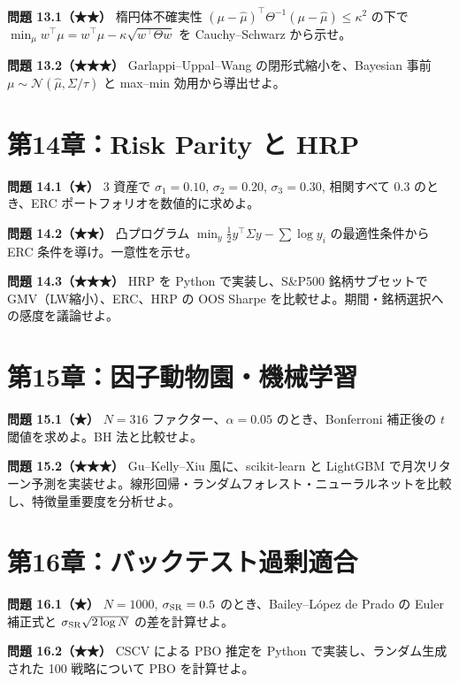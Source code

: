 \documentclass[11pt,a4paper]{report}
\begin{document}
\textbf{問題 13.1（★★）} 楕円体不確実性 $(\mu - \hat\mu)^\top \Theta^{-1} (\mu - \hat\mu) \le \kappa^2$ の下で $\min_\mu w^\top \mu = w^\top \hat\mu - \kappa \sqrt{w^\top \Theta w}$ を Cauchy–Schwarz から示せ。

\textbf{問題 13.2（★★★）} Garlappi–Uppal–Wang の閉形式縮小を、Bayesian 事前 $\mu \sim \mathcal{N}(\hat\mu, \Sigma/\tau)$ と max–min 効用から導出せよ。

\section{第14章：Risk Parity と HRP}

\textbf{問題 14.1（★）} 3 資産で $\sigma_1 = 0.10$, $\sigma_2 = 0.20$, $\sigma_3 = 0.30$, 相関すべて $0.3$ のとき、ERC ポートフォリオを数値的に求めよ。

\textbf{問題 14.2（★★）} 凸プログラム $\min_y \tfrac{1}{2} y^\top \Sigma y - \sum \log y_i$ の最適性条件から ERC 条件を導け。一意性を示せ。

\textbf{問題 14.3（★★★）} HRP を Python で実装し、S\&P500 銘柄サブセットで GMV（LW縮小）、ERC、HRP の OOS Sharpe を比較せよ。期間・銘柄選択への感度を議論せよ。

\section{第15章：因子動物園・機械学習}

\textbf{問題 15.1（★）} $N = 316$ ファクター、$\alpha = 0.05$ のとき、Bonferroni 補正後の $t$ 閾値を求めよ。BH 法と比較せよ。

\textbf{問題 15.2（★★★）} Gu–Kelly–Xiu 風に、scikit-learn と LightGBM で月次リターン予測を実装せよ。線形回帰・ランダムフォレスト・ニューラルネットを比較し、特徴量重要度を分析せよ。

\section{第16章：バックテスト過剰適合}

\textbf{問題 16.1（★）} $N = 1000$, $\sigma_{\rm SR} = 0.5$ のとき、Bailey–López de Prado の Euler 補正式と $\sigma_{\rm SR}\sqrt{2 \log N}$ の差を計算せよ。

\textbf{問題 16.2（★★）} CSCV による PBO 推定を Python で実装し、ランダム生成された 100 戦略について PBO を計算せよ。

\noindent\hrulefill
\end{document}
